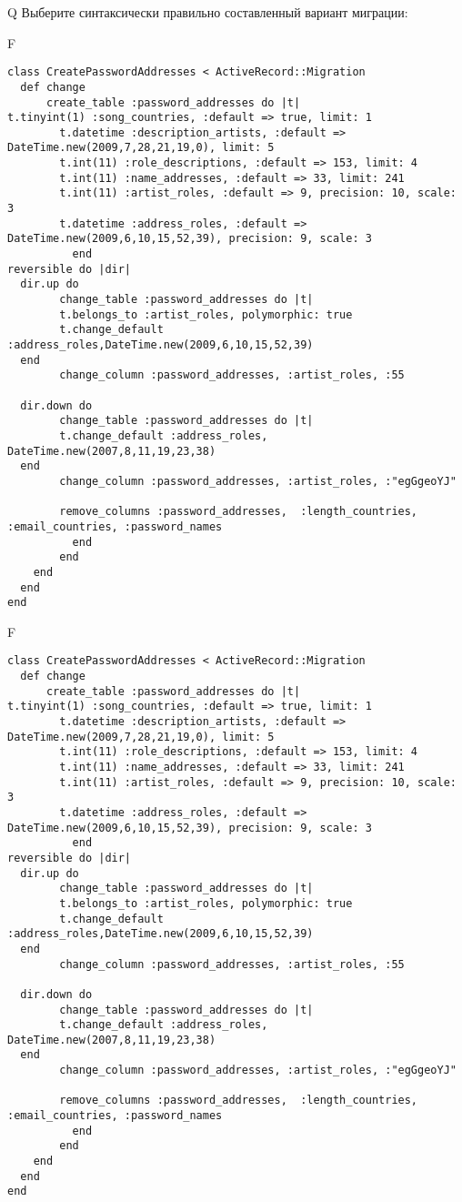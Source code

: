 Q
Выберите синтаксически правильно составленный вариант миграции:

F
\begin{verbatim}
class CreatePasswordAddresses < ActiveRecord::Migration
  def change
	  create_table :password_addresses do |t|
t.tinyint(1) :song_countries, :default => true, limit: 1
		t.datetime :description_artists, :default => DateTime.new(2009,7,28,21,19,0), limit: 5
		t.int(11) :role_descriptions, :default => 153, limit: 4
		t.int(11) :name_addresses, :default => 33, limit: 241
		t.int(11) :artist_roles, :default => 9, precision: 10, scale: 3
		t.datetime :address_roles, :default => DateTime.new(2009,6,10,15,52,39), precision: 9, scale: 3
		  end
reversible do |dir|
  dir.up do
		change_table :password_addresses do |t|
		t.belongs_to :artist_roles, polymorphic: true
 		t.change_default :address_roles,DateTime.new(2009,6,10,15,52,39)
  end
 		change_column :password_addresses, :artist_roles, :55
   
  dir.down do
		change_table :password_addresses do |t|
		t.change_default :address_roles, DateTime.new(2007,8,11,19,23,38)
  end
 		change_column :password_addresses, :artist_roles, :"egGgeoYJ"
   
		remove_columns :password_addresses,  :length_countries, :email_countries, :password_names 
	      end
	    end
    end 
  end
end

\end{verbatim}

F
\begin{verbatim}
class CreatePasswordAddresses < ActiveRecord::Migration
  def change
	  create_table :password_addresses do |t|
t.tinyint(1) :song_countries, :default => true, limit: 1
		t.datetime :description_artists, :default => DateTime.new(2009,7,28,21,19,0), limit: 5
		t.int(11) :role_descriptions, :default => 153, limit: 4
		t.int(11) :name_addresses, :default => 33, limit: 241
		t.int(11) :artist_roles, :default => 9, precision: 10, scale: 3
		t.datetime :address_roles, :default => DateTime.new(2009,6,10,15,52,39), precision: 9, scale: 3
		  end
reversible do |dir|
  dir.up do
		change_table :password_addresses do |t|
		t.belongs_to :artist_roles, polymorphic: true
 		t.change_default :address_roles,DateTime.new(2009,6,10,15,52,39)
  end
 		change_column :password_addresses, :artist_roles, :55
   
  dir.down do
		change_table :password_addresses do |t|
		t.change_default :address_roles, DateTime.new(2007,8,11,19,23,38)
  end
 		change_column :password_addresses, :artist_roles, :"egGgeoYJ"
   
		remove_columns :password_addresses,  :length_countries, :email_countries, :password_names 
	      end
	    end
    end 
  end
end

\end{verbatim}

